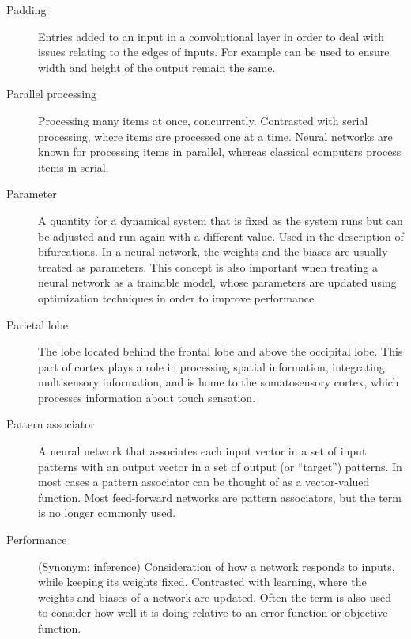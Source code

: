 \begin{description}
\item[Padding] Entries added to an input in a convolutional layer in order to deal with issues relating to the edges of inputs. For example can be used to ensure width and height of the output remain the same.

\item[Parallel processing] Processing many items at once, concurrently. Contrasted with serial processing, where items are processed one at a time.  Neural networks are known for processing items in parallel, whereas classical computers process items in serial.

\item[Parameter] A quantity for a dynamical system that is fixed as the system runs but can be adjusted and run again with a different value. Used in the description of bifurcations. In a neural network, the weights and the biases are usually treated as parameters. This concept is also important when treating a neural network as a trainable model, whose parameters are updated using optimization techniques in order to improve performance. 

\item[Parietal lobe] The lobe located behind the frontal lobe and above the occipital lobe. This part of cortex plays a role in processing spatial information, integrating multisensory information, and is home to the somatosensory cortex, which processes information about touch sensation.

\item[Pattern associator] A neural network that associates each input vector in a set of input patterns with an output vector in a set of output (or ``target'') patterns. In most cases a pattern associator can be thought of as a vector-valued function. Most feed-forward networks are pattern associators, but the term is no longer commonly used.
	


\item[Performance] (Synonym: inference) Consideration of how a network responds to inputs, while keeping its weights fixed. Contrasted with learning, where the weights and biases of a network are updated. Often the term is also used to consider how well it is doing relative to an error function or objective function.


\end{description}
